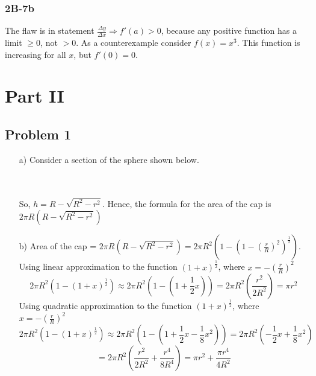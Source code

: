\documentclass{article}
\begin{document}
\subsubsection{2B-7b} The flaw is in statement $\frac{\Delta y}{\Delta x} \Rightarrow f'(a) > 0$, because any positive function has a limit $\geq 0$, not $> 0$. As a counterexample consider $f(x) = x^3$. This function is increasing for all $x$, but $f'(0) = 0$.

\section{Part II}
\subsection{Problem 1}
\begin{itemize}
    \item[a)] Consider a section of the sphere shown below.
    \begin{figure}[htp!]
      \centering
      
      \label{fig:fig6}
    \end{figure}
    \\ \\So, $h = R - \sqrt{R^2 - r^2}$. Hence, the formula for the area of the cap is $2 \pi R \left( R - \sqrt{R^2-r^2} \right)$
    \item[b)] Area of the cap = $2 \pi R \left( R - \sqrt{R^2-r^2} \right) = 2 \pi R^2 \left( 1 - \left(1- \left( \frac{r}{R} \right)^2\right)^\frac{1}{2} \right)$. \\ Using linear approximation to the function $(1+x)^\frac{1}{2}$, where $x = -\left(\frac{r}{R}\right)^2$
    \[ 2 \pi R^2 \left( 1 - \left(1+ x\right)^\frac{1}{2} \right) \approx 2 \pi R^2 \left( 1 - \left(1 + \frac{1}{2}x\right) \right) = 2 \pi R^2 \left( \frac{r^2}{2R^2} \right) = \pi r^2 \]
    Using quadratic approximation to the function $(1+x)^\frac{1}{2}$, where $x = -\left(\frac{r}{R}\right)^2$
    \[ 2 \pi R^2 \left( 1 - \left(1+ x\right)^\frac{1}{2} \right) \approx 2 \pi R^2 \left( 1 - \left(1 + \frac{1}{2}x - \frac{1}{8}x^2\right) \right) = 2 \pi R^2 \left( -\frac{1}{2}x + \frac{1}{8}x^2 \right) \]
    \[ = 2 \pi R^2 \left( \frac{r^2}{2R^2} + \frac{r^4}{8R^4} \right) = \pi r^2+ \frac{\pi r^4}{4R^2} \]


\end{itemize}
\end{document}
